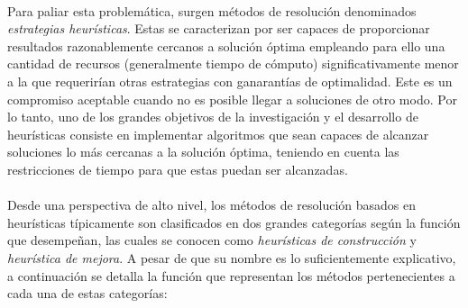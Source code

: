 \documentclass{subfiles}
\begin{document}
      \paragraph{}
      Para paliar esta problemática, surgen métodos de resolución denominados \emph{estrategias heurísticas}. Estas se caracterizan por ser capaces de proporcionar resultados razonablemente cercanos a solución óptima empleando para ello una cantidad de recursos (generalmente tiempo de cómputo) significativamente menor a la que requerirían otras estrategias con ganarantías de optimalidad. Este es un compromiso aceptable cuando no es posible llegar a soluciones de otro modo. Por lo tanto, uno de los grandes objetivos de la investigación y el desarrollo de heurísticas consiste en implementar algoritmos que sean capaces de alcanzar soluciones lo más cercanas a la solución óptima, teniendo en cuenta las restricciones de tiempo para que estas puedan ser alcanzadas.

      \paragraph{}
      Desde una perspectiva de alto nivel, los métodos de resolución basados en heurísticas típicamente son clasificados en dos grandes categorías según la función que desempeñan, las cuales se conocen como \emph{heurísticas de construcción} y \emph{heurística de mejora}. A pesar de que su nombre es lo suficientemente explicativo, a continuación se detalla la función que representan los métodos pertenecientes a cada una de estas categorías:
      
\end{document}
